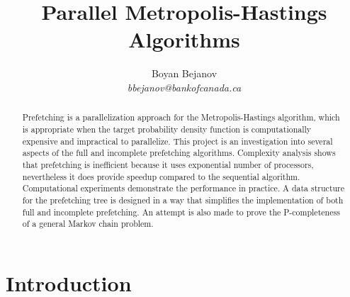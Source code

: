 \documentclass[11pt,letterpaper]{article}       %
\begin{document}


\title{Parallel Metropolis-Hastings Algorithms}


\author{
Boyan Bejanov\\
{\em bbejanov@bankofcanada.ca}
} %

\maketitle

\begin{abstract} 
Prefetching is a parallelization approach for the Metropolis-Hastings
algorithm, which is appropriate when the target probability density function is
computationally expensive and impractical to parallelize.  This project is an
investigation into several aspects of the full and incomplete prefetching
algorithms.  Complexity analysis shows that prefetching is inefficient because
it uses exponential number of processors, nevertheless it does provide speedup
compared to the sequential algorithm.  Computational experiments demonstrate
the performance in practice.  A data structure for the prefetching tree is
designed in a way that simplifies the implementation of both full and
incomplete prefetching.  An attempt is also made to prove the P-completeness of
a general Markov chain problem.  
\end{abstract}


\section{Introduction} \label{intro}
\end{document}
